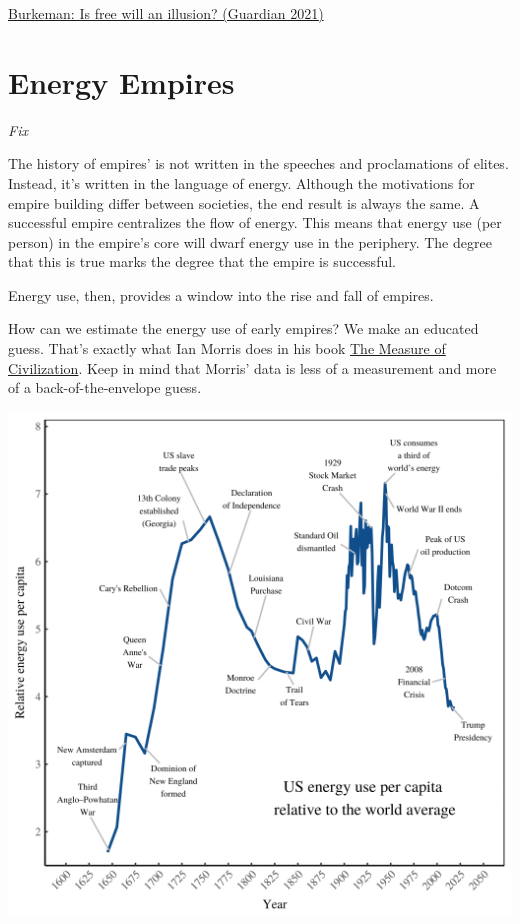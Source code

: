 \documentclass[
]{book}
\begin{document}
\href{https://www.theguardian.com/news/2021/apr/27/the-clockwork-universe-is-free-will-an-illusion}{Burkeman: Is free will an illusion? (Guardian 2021)}

\hypertarget{energy-empires}{%
\chapter{Energy Empires}\label{energy-empires}}

\emph{Fix}

The history of empires' is not written in the speeches and proclamations of elites.
Instead, it's written in the language of energy.
Although the motivations for empire building differ between societies,
the end result is always the same.
A successful empire centralizes the flow of energy.
This means that energy use (per person) in the empire's core
will dwarf energy use in the periphery.
The degree that this is true marks the degree that the empire is successful.

Energy use, then, provides a window into the rise and fall of empires.

How can we estimate the energy use of early empires? We make an educated guess.
That's exactly what
Ian Morris does in his book
\href{https://www.goodreads.com/book/show/18730662-the-measure-of-civilization}{The Measure of Civilization}.
Keep in mind that Morris' data is less of a measurement and more of a back-of-the-envelope guess.

\includegraphics{fig/us_energy_pc.png}
\end{document}

